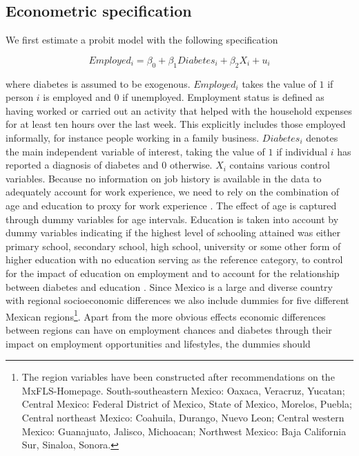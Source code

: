 \subsection{Econometric specification}

We first estimate a probit model with the following specification 


\begin{equation}
Employed_{i}=\beta_{0}+\beta_{1}Diabetes_{i}+\beta_{2}X_{i}+u_{i}\label{eq:employed-2}
\end{equation}


where diabetes is assumed to be exogenous. $Employed_{i}$
takes the value of $1$ if person $i$ is employed and $0$ if unemployed.
Employment status is defined as having worked or carried out an activity
that helped with the household expenses for at least ten hours over
the last week. This explicitly includes those employed informally,
for instance people working in a family business. $Diabetes_{i}$
denotes the main independent variable of interest, taking the value
of $1$ if individual $i$ has reported a diagnosis of diabetes and
$0$ otherwise. $X_{i}$ contains various control variables. Because
no information on job history is available in the data to adequately
account for work experience, we need to rely on the combination of
age and education to proxy for work experience \parencite{Aaronson2010}.
The effect of age is captured through dummy variables for age intervals.
Education is taken into account by dummy variables indicating if the
highest level of schooling attained was either primary school, secondary
school, high school, university or some other form of higher education
with no education serving as the reference category, to control for
the impact of education on employment and to account for the relationship
between diabetes and education \parencite{Agardh2011a}. Since Mexico
is a large and diverse country with regional socioeconomic differences
we also include dummies for five different Mexican regions\footnote{The region variables have been constructed after recommendations on
the MxFLS-Homepage. South-southeastern Mexico: Oaxaca, Veracruz, Yucatan;
Central Mexico: Federal District of Mexico, State of Mexico, Morelos,
Puebla; Central northeast Mexico: Coahuila, Durango, Nuevo Leon; Central
western Mexico: Guanajuato, Jalisco, Michoacan; Northwest Mexico:
Baja California Sur, Sinaloa, Sonora.}. Apart from the more obvious effects economic differences between
regions can have on employment chances and diabetes through their
impact on employment opportunities and lifestyles, the dummies should
